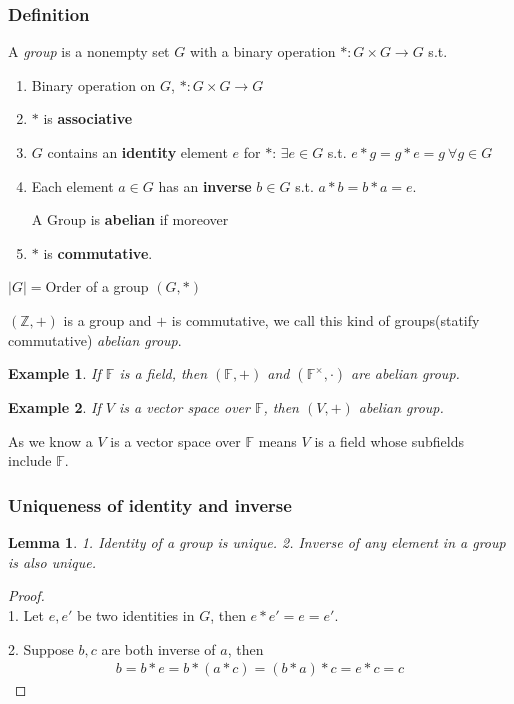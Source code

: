 \documentclass[11pt,a4paper]{article}
\newtheorem{lemma}{Lemma}
\newtheorem{example}{Example}
\begin{document}
\subsubsection{Definition}
A \textit{group} is a nonempty set $G$ with a binary operation $*:G \times G \rightarrow G$ s.t.
\begin{enumerate}[(1)]
    \item Binary operation on $G$, $*:G \times G \rightarrow G$
    \item $*$ is \textbf{associative}
    \item $G$ contains an \textbf{identity} element $e$ for $*$: $\exists e\in G$ s.t. $e * g = g * e = g\ \forall g \in G$
    \item Each element $a\in G$ has an \textbf{inverse} $b\in G$ s.t. $a*b=b*a=e$.

A Group is \textbf{abelian} if moreover
    \item $*$ is \textbf{commutative}.
\end{enumerate}

$|G|= $Order of a group $(G,*)$

$(\mathbb{Z},+)$ is a group and $+$ is commutative, we call this kind of groups(statify commutative) \textit{abelian group}.
\begin{example}
If $\mathbb{F}$ is a field, then $(\mathbb{F},+)$ and $(\mathbb{F}^{\times},\cdot)$ are abelian group.
\end{example}
\begin{example}
If $V$ is a vector space over $\mathbb{F}$, then $(V,+)$ abelian group.
\end{example}
As we know a $V$ is a vector space over $\mathbb{F}$ means $V$ is a field whose subfields include $\mathbb{F}$.

\subsubsection{Uniqueness of identity and inverse}
\begin{lemma}
    1. Identity of a group is unique. 2. Inverse of any element in a group is also unique.
\end{lemma}
\begin{proof}
\quad\\
1. Let $e,e'$ be two identities in $G$, then $e*e'=e=e'$.

2. Suppose $b,c$ are both inverse of $a$, then
\begin{equation}
    \begin{aligned}
        b=b*e=b*(a*c)=(b*a)*c=e*c=c
    \end{aligned}
    \nonumber
\end{equation}
\end{proof}
\end{document}
